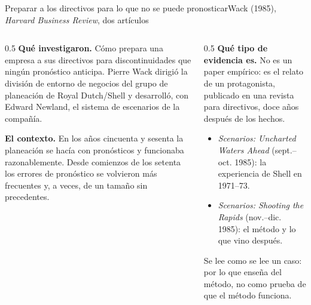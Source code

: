 \documentclass{beamer}
\begin{document}
\begin{frame}{Preparar a los directivos para lo que no se puede pronosticar}{Wack (1985), \emph{Harvard Business Review}, dos artículos}
\small
\begin{columns}[T]
\begin{column}{0.5\textwidth}
\textbf{Qué investigaron.} Cómo prepara una empresa a sus directivos para discontinuidades que ningún pronóstico anticipa. Pierre Wack dirigió la división de entorno de negocios del grupo de planeación de Royal Dutch/Shell y desarrolló, con Edward Newland, el sistema de escenarios de la compañía.

\medskip
\textbf{El contexto.} En los años cincuenta y sesenta la planeación se hacía con pronósticos y funcionaba razonablemente. Desde comienzos de los setenta los errores de pronóstico se volvieron más frecuentes y, a veces, de un tamaño sin precedentes.
\end{column}
\begin{column}{0.5\textwidth}
\textbf{Qué tipo de evidencia es.} No es un paper empírico: es el relato de un protagonista, publicado en una revista para directivos, doce años después de los hechos.
\begin{itemize}\itemsep3pt
  \item \emph{Scenarios: Uncharted Waters Ahead} (sept.--oct. 1985): la experiencia de Shell en 1971--73.
  \item \emph{Scenarios: Shooting the Rapids} (nov.--dic. 1985): el método y lo que vino después.
\end{itemize}
Se lee como se lee un caso: por lo que enseña del método, no como prueba de que el método funciona.
\end{column}
\end{columns}
\end{frame}
\end{document}
